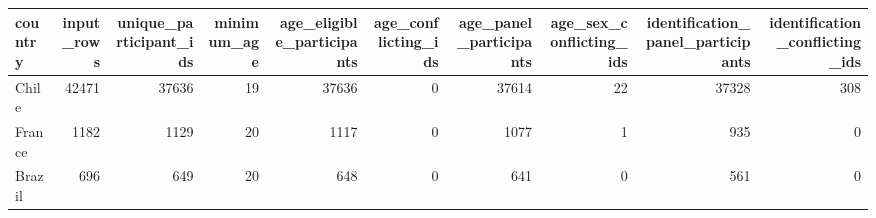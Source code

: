 \begin{tabular}{lrrrrrrrrr}
\toprule
country & input_rows & unique_participant_ids & minimum_age & age_eligible_participants & age_conflicting_ids & age_panel_participants & age_sex_conflicting_ids & identification_panel_participants & identification_conflicting_ids \\
\midrule
Chile & 42471 & 37636 & 19 & 37636 & 0 & 37614 & 22 & 37328 & 308 \\
France & 1182 & 1129 & 20 & 1117 & 0 & 1077 & 1 & 935 & 0 \\
Brazil & 696 & 649 & 20 & 648 & 0 & 641 & 0 & 561 & 0 \\
\bottomrule
\end{tabular}
